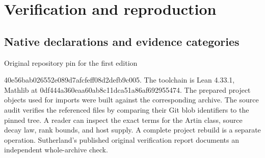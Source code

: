 \documentclass[12pt,letterpaper]{article}
\DeclareRobustCommand{\id}[1]{\mbox{\small\ttfamily #1}}
\begin{document}
\section{Verification and reproduction}
\label{sec:audit}

\subsection{Native declarations and evidence categories}

Original repository pin for the first edition\par\noindent \id{40e56bab026552e089d7afcfeff08d2defb9c005}. The toolchain is Lean 4.33.1, Mathlib at \id{0df444a360eaa60ab8c11dca51a86af692955474}. The prepared project objects used for imports were built against the corresponding archive. The source audit verifies the referenced files by comparing their Git blob identifiers to the pinned tree. A reader can inspect the exact terms for the Artin class, source decay law, rank bounds, and host supply. A complete project rebuild is a separate operation. Sutherland's published original verification report documents an independent whole-archive check.
\end{document}
